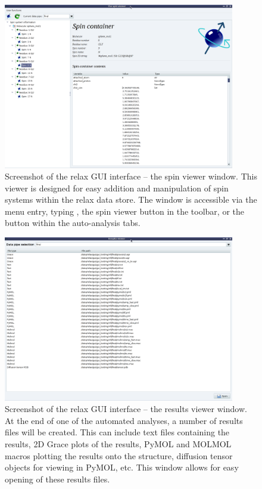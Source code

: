 \begin{figure}
\centerline{\includegraphics[width=0.9\textwidth, bb=14 14 1065 768]{graphics/screenshots/spin_viewer}}
\caption[Spin viewer window screenshot]{Screenshot of the relax GUI interface -- the spin viewer window.  This viewer is designed for easy addition and manipulation of spin systems within the relax data store.  The window is accessible via the  menu entry, typing , the spin viewer button in the toolbar, or the  button within the auto-analysis tabs.}\label{fig: screenshot: spin viewer}
\end{figure}

\begin{figure}
\centerline{\includegraphics[width=0.9\textwidth, bb=14 14 1065 768]{graphics/screenshots/results_viewer}}
\caption[Results viewer window screenshot]{Screenshot of the relax GUI interface -- the results viewer window.  At the end of one of the automated analyses, a number of results files will be created.  This can include text files containing the results, 2D Grace plots of the results, PyMOL and MOLMOL macros plotting the results onto the structure, diffusion tensor objects for viewing in PyMOL, etc.  This window allows for easy opening of these results files.}\label{fig: screenshot: results viewer}
\end{figure}

